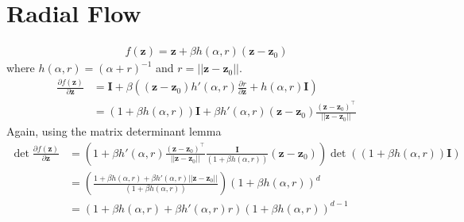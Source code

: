 \documentclass[]{article}
\begin{document}
\section{Radial Flow}
\begin{align*}
	f(\mathbf{z}) = \mathbf{z} + \beta h(\alpha,r)(\mathbf{z}-\mathbf{z}_0)
\end{align*}
where $h(\alpha,r) = (\alpha + r)^{-1}$ and $r = ||\mathbf{z}-\mathbf{z}_0||$.
\begin{align*}
\frac{\partial f(\mathbf{z})}{\partial \mathbf{z}} &= \mathbf{I} + \beta\left((\mathbf{z}-\mathbf{z}_0)h'(\alpha,r)\frac{\partial r}{\partial \mathbf{z}} + h(\alpha,r)\mathbf{I}\right)\\
&=(1+\beta h(\alpha,r))\mathbf{I} + \beta h'(\alpha,r)(\mathbf{z}-\mathbf{z}_0)\frac{(\mathbf{z}-\mathbf{z}_0)^\top}{||\mathbf{z}-\mathbf{z}_0||}
\end{align*}
Again, using the matrix determinant lemma
\begin{align*}
\det\frac{\partial f(\mathbf{z})}{\partial \mathbf{z}} &= \left(1 + \beta h'(\alpha,r)\frac{(\mathbf{z}-\mathbf{z}_0)^\top}{||\mathbf{z}-\mathbf{z}_0||}\frac{\mathbf{I}}{(1+\beta h(\alpha,r))}(\mathbf{z}-\mathbf{z}_0)\right)\det((1+\beta h(\alpha,r))\mathbf{I})\\
&=\left(\frac{1 + \beta h(\alpha,r) + \beta h'(\alpha,r)||\mathbf{z}-\mathbf{z}_0||}{(1+\beta h(\alpha,r))}\right)(1+\beta h(\alpha,r))^d\\
&=\left(1 + \beta h(\alpha,r) + \beta h'(\alpha,r)r\right)(1+\beta h(\alpha,r))^{d-1}\\
\end{align*}
\end{document}
